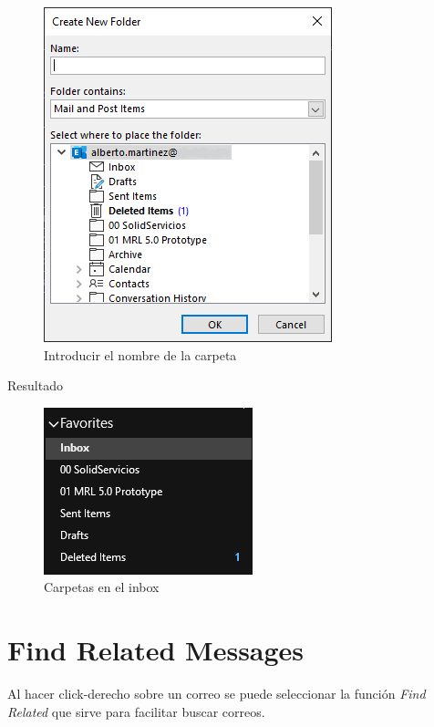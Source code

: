 \documentclass[12pt,letterpaper,final]{report}
\begin{document}
\begin{figure}[H]
	\centering
	\includegraphics[width=0.65\linewidth, height=0.45\textheight,keepaspectratio]{Imagenes/outlook_createfolders02}
	\caption{Introducir el nombre de la carpeta}
	\label{fig:outlookcreatefolders02}
\end{figure}

{\LARGE Resultado}

\begin{figure}[H]
	\centering
	\includegraphics[width=0.55\linewidth, height=0.35\textheight,keepaspectratio]{Imagenes/outlook_createfolders03}
	\caption{Carpetas en el inbox}
	\label{fig:outlookcreatefolders03}
\end{figure}

\chapter{Find Related Messages}

Al hacer click-derecho sobre un correo se puede seleccionar la función \emph{Find Related} que sirve para facilitar buscar correos.
\end{document}
